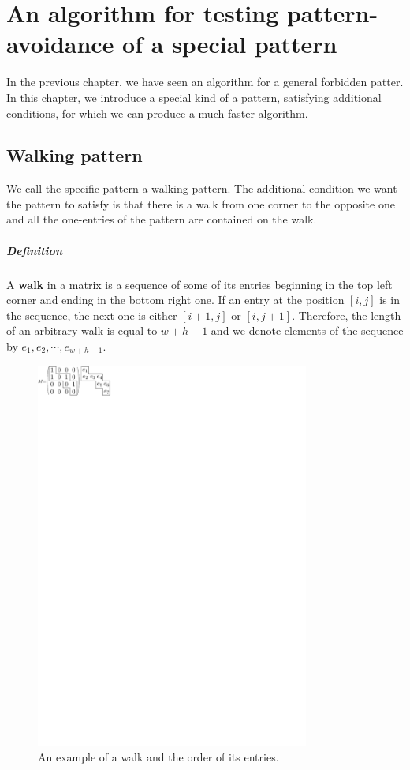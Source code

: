 \chapter{An algorithm for testing pattern-avoidance of a special pattern}
\label{chap:walking}
In the previous chapter, we have seen an algorithm for a general forbidden patter. In this chapter, we introduce a special kind of a pattern, satisfying additional conditions, for which we can produce a much faster algorithm.

\section{Walking pattern}
We call the specific pattern a walking pattern. The additional condition we want the pattern to satisfy is that there is a walk from one corner to the opposite one and all the one-entries of the pattern are contained on the walk.
\paragraph{Definition}
A \textbf{walk} in a matrix is a sequence of some of its entries beginning in the top left corner and ending in the bottom right one. If an entry at the position $[i,j]$ is in the sequence, the next one is either $[i+1,j]$ or $[i,j+1]$. Therefore, the length of an arbitrary walk is equal to $w+h-1$ and we denote elements of the sequence by $e_1,e_2,\cdots,e_{w+h-1}$.
\begin{figure}[h!]
\centering
\includegraphics[width=90mm]{../img/walk.pdf}
\caption{An example of a walk and the order of its entries.}
\label{walk}
\end{figure}

